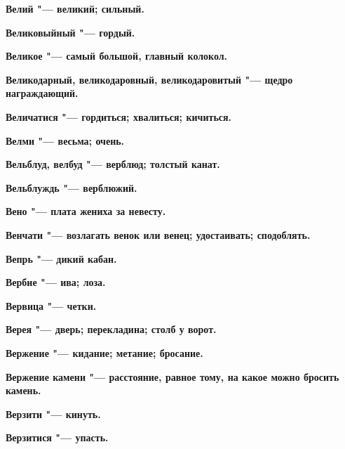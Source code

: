\bfseries Велий \normalfont{} "--- великий; сильный. 




\bfseries Великовыйный \normalfont{} "--- гордый. 




\bfseries Великое \normalfont{} "--- самый большой, главный колокол. 




\bfseries Великодарный, великодаровный, великодаровитый \normalfont{} "--- щедро награждающий. 




\bfseries Величатися \normalfont{} "--- гордиться; хвалиться; кичиться. 




\bfseries Велми \normalfont{} "--- весьма; очень. 




\bfseries Вельблуд, велбуд \normalfont{} "--- верблюд; толстый канат. 




\bfseries Вельблуждь \normalfont{} "--- верблюжий. 




\bfseries Вено \normalfont{} "--- плата жениха за невесту. 




\bfseries Венчати \normalfont{} "--- возлагать венок или венец; удостаивать; сподоблять. 




\bfseries Вепрь \normalfont{} "--- дикий кабан. 




\bfseries Вербие \normalfont{} "--- ива; лоза. 




\bfseries Вервица \normalfont{} "--- четки. 




\bfseries Верея \normalfont{} "--- дверь; перекладина; столб у ворот. 




\bfseries Вержение \normalfont{} "--- кидание; метание; бросание. 




\bfseries Вержение камени \normalfont{} "--- расстояние, равное тому, на какое можно бросить камень. 




\bfseries Верзити \normalfont{} "--- кинуть. 




\bfseries Верзитися \normalfont{} "--- упасть. 




